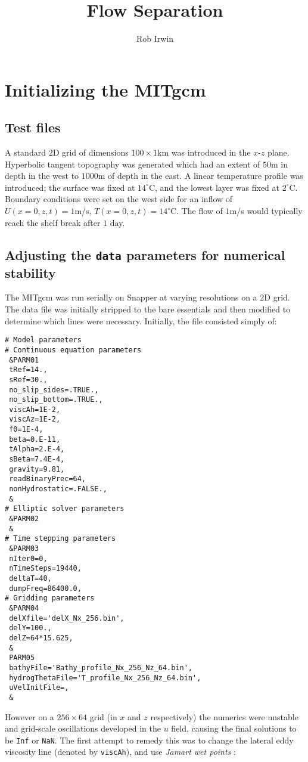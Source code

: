 \documentclass[11pt]{article}
\title{Flow Separation}
\author{Rob Irwin}
\begin{document}
\maketitle

\section{Initializing the MITgcm}

\subsection{Test files}

A standard 2D grid of dimensions $100\times1$km was introduced in the $x$-$z$ plane. Hyperbolic tangent topography was generated which had an extent of $50$m in depth in the west to $1000$m of depth in the east. A linear temperature profile was introduced; the surface was fixed at $14^\circ$C, and the lowest layer was fixed at $2^\circ$C. Boundary conditions were set on the west side for an inflow of $U(x=0,z,t)=1$m/s, $T(x=0,z,t)=14^\circ$C. The flow of $1$m/s would typically reach the shelf break after $1$ day.

\subsection{Adjusting the \texttt{data} parameters for numerical stability}

The MITgcm was run serially on Snapper at varying resolutions on a 2D grid. The data file was initially stripped to the bare essentials and then modified to determine which lines were necessary. Initially, the file consisted simply of:

\begin{lstlisting}
# Model parameters
# Continuous equation parameters
 &PARM01
 tRef=14.,
 sRef=30.,
 no_slip_sides=.TRUE.,
 no_slip_bottom=.TRUE.,
 viscAh=1E-2,
 viscAz=1E-2,
 f0=1E-4,
 beta=0.E-11,
 tAlpha=2.E-4,
 sBeta=7.4E-4,
 gravity=9.81,
 readBinaryPrec=64,
 nonHydrostatic=.FALSE.,
 &
# Elliptic solver parameters
 &PARM02
 &
# Time stepping parameters
 &PARM03
 nIter0=0,
 nTimeSteps=19440,
 deltaT=40,
 dumpFreq=86400.0,
# Gridding parameters
 &PARM04
 delXfile='delX_Nx_256.bin',
 delY=100.,
 delZ=64*15.625,
 &
 PARM05
 bathyFile='Bathy_profile_Nx_256_Nz_64.bin',
 hydrogThetaFile='T_profile_Nx_256_Nz_64.bin',
 uVelInitFile=,
 &
\end{lstlisting}

However on a $256 \times 64$ grid (in $x$ and $z$ respectively) the numerics were unstable and grid-scale oscillations developed in the $u$ field, causing the final solutions to be \texttt{Inf} or \texttt{NaN}. The first attempt to remedy this was to change the lateral eddy viscosity line (denoted by \texttt{viscAh}), and use \textit{Jamart wet points} \cite{jamart}:
\end{document}
